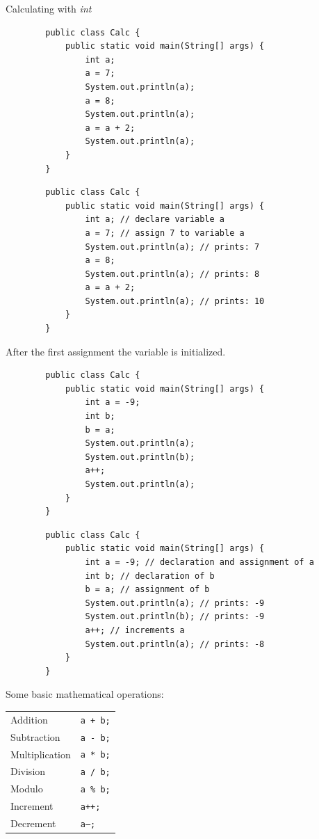 \begin{frame}{Calculating with \emph{int}}
	\begin{lstlisting}
		public class Calc {
			public static void main(String[] args) {
				int a;
				a = 7;
				System.out.println(a);
				a = 8;
				System.out.println(a);
				a = a + 2;
				System.out.println(a);
			}
		}
	\end{lstlisting}
	
	\framebreak
	\begin{lstlisting}
		public class Calc {
			public static void main(String[] args) {
				int a; // declare variable a
				a = 7; // assign 7 to variable a
				System.out.println(a); // prints: 7
				a = 8;
				System.out.println(a); // prints: 8
				a = a + 2;
				System.out.println(a); // prints: 10
			}
		}
	\end{lstlisting}
	After the first assignment the variable is initialized.
	\framebreak
	\begin{lstlisting}
		public class Calc {
			public static void main(String[] args) {
				int a = -9;
				int b;
				b = a;
				System.out.println(a);
				System.out.println(b); 
				a++;
				System.out.println(a); 
			}
		}
	\end{lstlisting}
	\framebreak
	\begin{lstlisting}
		public class Calc {
			public static void main(String[] args) {
				int a = -9; // declaration and assignment of a
				int b; // declaration of b
				b = a; // assignment of b
				System.out.println(a); // prints: -9
				System.out.println(b); // prints: -9
				a++; // increments a
				System.out.println(a); // prints: -8
			}
		}
	\end{lstlisting}
	
	\framebreak
	Some basic mathematical operations:
	\begin{tabular}{ll}
		Addition & \texttt{a + b;} \\
		Subtraction & \texttt{a - b;} \\
		Multiplication &\texttt{a * b;} \\
		Division & \texttt{a / b;} \\
		Modulo & \texttt{a \% b;} \\
		Increment & \texttt{a++;} \\
		Decrement & \texttt{a--;} \\
	\end{tabular}
\end{frame}


